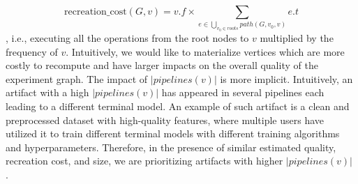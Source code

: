 \[
\text{recreation\_cost}(G,v) = v.f \times \sum\limits_{e \in \bigcup\limits_{v_{0}\in roots} path(G, v_{0}, v)} e.t\]
, i.e., executing all the operations from the root nodes to $v$ multiplied by the frequency of $v$.
Intuitively, we would like to materialize vertices which are more costly to recompute and have larger impacts on the overall quality of the experiment graph.
The impact of $|pipelines(v)|$ is more implicit.
Intuitively, an artifact with a high $|pipelines(v)|$ has appeared in several pipelines each leading to a different terminal model.
An example of such artifact is a clean and preprocessed dataset with high-quality features, where multiple users have utilized it to train different terminal models with different training algorithms and hyperparameters.
Therefore, in the presence of similar estimated quality, recreation cost, and size, we are prioritizing artifacts with higher $|pipelines(v)|$ .

%
%
